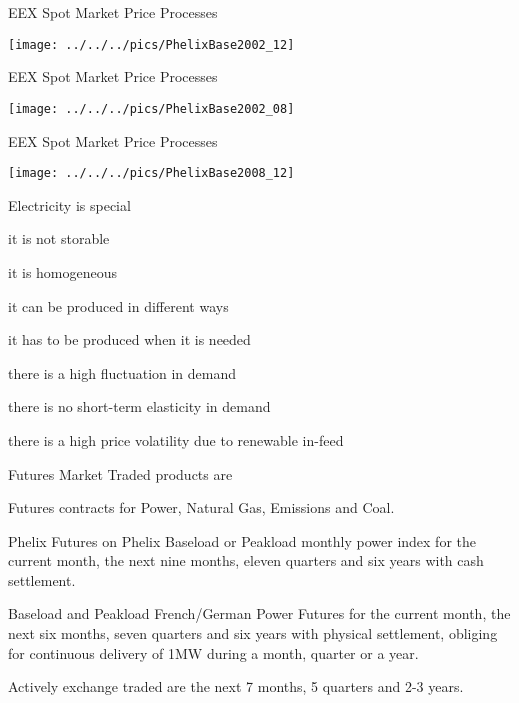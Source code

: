 


{EEX Spot Market Price Processes}

\texttt{[image: ../../../pics/PhelixBase2002\_12]}

{EEX Spot Market Price Processes}

\texttt{[image: ../../../pics/PhelixBase2002\_08]}

{EEX Spot Market Price Processes}

\texttt{[image: ../../../pics/PhelixBase2008\_12]}

{Electricity is special}






	it is not storable


	it is homogeneous


	it can be produced in different ways


	it has to be produced when it is needed


	there is a high fluctuation in demand


	there is no short-term elasticity in demand


	there is a high price volatility due to renewable in-feed






{Futures Market} Traded products are






	Futures contracts for Power, Natural Gas, Emissions and Coal.


	Phelix Futures on Phelix Baseload or Peakload monthly power index for the current month, the next nine months, eleven quarters and six years with cash settlement.


	Baseload and Peakload French/German Power Futures for the current month, the next six months, seven quarters and six years with physical settlement, obliging for continuous delivery of 1MW during a month, quarter or a year.


	Actively exchange traded are the next 7 months, 5 quarters and 2-3 years.


